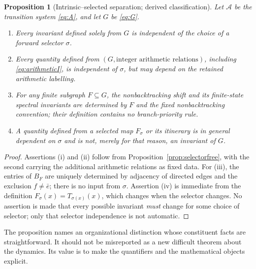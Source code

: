 \documentclass[11pt,a4paper]{article}
\newtheorem{proposition}[theorem]{Proposition}
\theoremstyle{definition}\newtheorem{definition}[theorem]{Definition}
\newcommand{\A}{\mathcal A}
\begin{document}
\begin{proposition}[Intrinsic--selected separation; derived classification]\label{prop:separation}
Let $\A$ be the transition system \eqref{eq:A}, and let $G$ be \eqref{eq:G}.
\begin{enumerate}[label=(\roman*)]
\item Every invariant defined solely from $G$ is independent of the choice of a forward selector $\sigma$.
\item Every quantity defined from $(G,\text{integer arithmetic relations})$, including \eqref{eq:arithmeticI}, is independent of $\sigma$, but may depend on the retained arithmetic labelling.
\item For any finite subgraph $F\subseteq G$, the nonbacktracking shift and its finite-state spectral invariants are determined by $F$ and the fixed nonbacktracking convention; their definition contains no branch-priority rule.
\item A quantity defined from a selected map $F_\sigma$ or its itinerary is in general dependent on $\sigma$ and is not, merely for that reason, an invariant of $G$.
\end{enumerate}
\end{proposition}
\begin{proof}
Assertions (i) and (ii) follow from Proposition~\ref{prop:selectorfree}, with the second carrying the additional arithmetic relations as fixed data. For (iii), the entries of $B_F$ are uniquely determined by adjacency of directed edges and the exclusion $f\ne\bar e$; there is no input from $\sigma$. Assertion (iv) is immediate from the definition $F_\sigma(x)=T_{\sigma(x)}(x)$, which changes when the selector changes. No assertion is made that every possible invariant \emph{must} change for some choice of selector; only that selector independence is not automatic.
\end{proof}

The proposition names an organizational distinction whose constituent facts are straightforward. It should not be misreported as a new difficult theorem about the dynamics. Its value is to make the quantifiers and the mathematical objects explicit.
\end{document}
